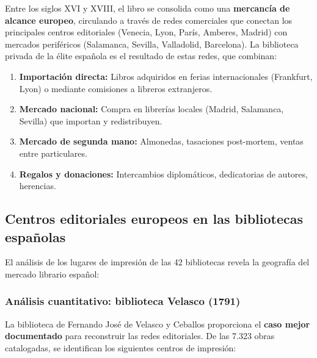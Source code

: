 \documentclass[11pt,a4paper]{article}
\begin{document}
Entre los siglos XVI y XVIII, el libro se consolida como una \textbf{mercancía de alcance europeo}, circulando a través de redes comerciales que conectan los principales centros editoriales (Venecia, Lyon, París, Amberes, Madrid) con mercados periféricos (Salamanca, Sevilla, Valladolid, Barcelona). La biblioteca privada de la élite española es el resultado de estas redes, que combinan:

\begin{enumerate}
\item \textbf{Importación directa:} Libros adquiridos en ferias internacionales (Frankfurt, Lyon) o mediante comisiones a libreros extranjeros.
\item \textbf{Mercado nacional:} Compra en librerías locales (Madrid, Salamanca, Sevilla) que importan y redistribuyen.
\item \textbf{Mercado de segunda mano:} Almonedas, tasaciones post-mortem, ventas entre particulares.
\item \textbf{Regalos y donaciones:} Intercambios diplomáticos, dedicatorias de autores, herencias.
\end{enumerate}

\subsection{Centros editoriales europeos en las bibliotecas españolas}

El análisis de los lugares de impresión de las 42 bibliotecas revela la geografía del mercado librario español:

\subsubsection{Análisis cuantitativo: biblioteca Velasco (1791)}

La biblioteca de Fernando José de Velasco y Ceballos proporciona el \textbf{caso mejor documentado} para reconstruir las redes editoriales. De las 7.323 obras catalogadas, se identifican los siguientes centros de impresión:
\end{document}

